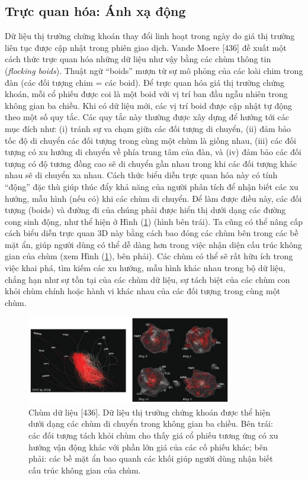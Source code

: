 \subsection{Trực quan hóa: Ánh xạ động}
Dữ liệu thị trường chứng khoán thay đổi linh hoạt trong ngày do giá thị trường liên tục được cập nhật trong phiên giao dịch. Vande Moere [436] đề xuất một cách thức trực quan hóa những dữ liệu như vậy bằng các chùm thông tin (\textit{flocking boids}). Thuật ngữ “boids” mượn từ sự mô phỏng của các loài chim trong đàn (các đối tượng chim = các boid). Để trực quan hóa giá thị trường chứng khoán, mỗi cổ phiếu được coi là một boid với vị trí ban đầu ngẫu nhiên trong không gian ba chiều. Khi có dữ liệu mới, các vị trí boid được cập nhật tự động theo một số quy tắc. Các quy tắc này thường được xây dựng để hướng tới các mục đích như: (i) tránh sự va chạm giữa các đối tượng di chuyển, (ii) đảm bảo tốc độ di chuyển các đối tượng trong cùng một chùm là giống nhau, (iii) các đối tượng có xu hướng di chuyển về phía trung tâm của đàn, và (iv) đảm bảo các đối tượng có độ tương đồng cao sẽ di chuyển gần nhau trong khi các đối tượng khác nhau sẽ di chuyển xa nhau. Cách thức biểu diễn trực quan hóa này có tính “động” đặc thù giúp thúc đẩy khả năng của người phân tích để nhận biết các xu hướng, mẫu hình (nếu có) khi các chùm di chuyển. Để làm được điều này, các đối tượng (boids) và đường đi của chúng phải được hiển thị dưới dạng các đường cong sinh động, như thể hiện ở Hình (\ref{fig:f7.13}) (hình bên trái). Ta cũng có thể nâng cấp cách biểu diễn trực quan 3D này bằng cách bao đóng các chùm bên trong các bề mặt ẩn, giúp người dùng có thể dễ dàng hơn trong việc nhận diện cấu trúc không gian của chùm (xem Hình (\ref{fig:f7.13}), bên phải). Các chùm có thể sẽ rất hữu ích trong việc khai phá, tìm kiếm các xu hướng, mẫu hình khác nhau trong bộ dữ liệu, chẳng hạn như sự tồn tại của các chùm dữ liệu, sự tách biệt của các chùm con khỏi chùm chính hoặc hành vi khác nhau của các đối tượng trong cùng một chùm.
\begin{figure}[H] %
    \centering %
    \includegraphics[width=0.8\textwidth]{assets/fig_7_13.png} 
    \caption{Chùm dữ liệu [436]. Dữ liệu thị trường chứng khoán được thể hiện dưới dạng các chùm di chuyển trong không gian ba chiều. Bên trái: các đối tượng tách khỏi chùm cho thấy giá cổ phiếu tương ứng có xu hướng vận động khác với phần lớn giá của các cố phiếu khác; bên phải: các bề mặt ẩn bao quanh các khối giúp người dùng nhận biết cấu trúc không gian của chùm.} %
    \label{fig:f7.13}
\end{figure}